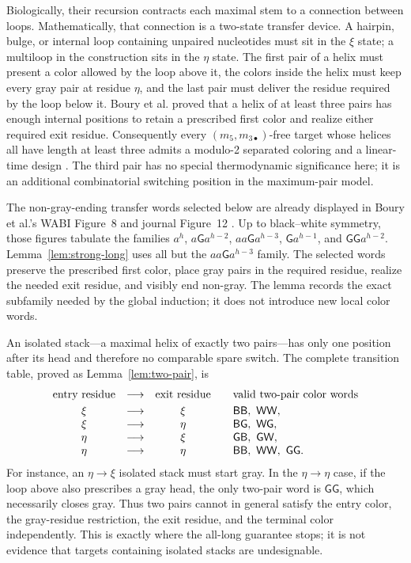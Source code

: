 \documentclass[11pt]{article}
\newcommand{\Bcol}{\mathsf{B}}
\newcommand{\Wcol}{\mathsf{W}}
\newcommand{\Gray}{\mathsf{G}}
\begin{document}
Biologically, their recursion contracts each maximal stem to a connection between loops.  Mathematically, that connection is a two-state transfer device.  A hairpin, bulge, or internal loop containing unpaired nucleotides must sit in the $\xi$ state; a multiloop in the construction sits in the $\eta$ state.  The first pair of a helix must present a color allowed by the loop above it, the colors inside the helix must keep every gray pair at residue $\eta$, and the last pair must deliver the residue required by the loop below it.  Boury et al. proved that a helix of at least three pairs has enough internal positions to retain a prescribed first color and realize either required exit residue.  Consequently every $(m_5,m_{3\bullet})$-free target whose helices all have length at least three admits a modulo-2 separated coloring and a linear-time design \citep{boury2024,boury2025}.  The third pair has no special thermodynamic significance here; it is an additional combinatorial switching position in the maximum-pair model.

The non-gray-ending transfer words selected below are already displayed in Boury et al.'s WABI Figure~8 and journal Figure~12 \citep{boury2024,boury2025}.  Up to black--white symmetry, those figures tabulate the families $a^h$, $a\Gray a^{h-2}$, $aa\Gray a^{h-3}$, $\Gray a^{h-1}$, and $\Gray\Gray a^{h-2}$.  Lemma~\ref{lem:strong-long} uses all but the $aa\Gray a^{h-3}$ family.  The selected words preserve the prescribed first color, place gray pairs in the required residue, realize the needed exit residue, and visibly end non-gray.  The lemma records the exact subfamily needed by the global induction; it does not introduce new local color words.

An isolated stack---a maximal helix of exactly two pairs---has only one position after its head and therefore no comparable spare switch.  The complete transition table, proved as Lemma~\ref{lem:two-pair}, is
\[
\begin{array}{c@{\quad\longrightarrow\quad}c@{\qquad}l}
\text{entry residue} & \text{exit residue} & \text{valid two-pair color words}\\[1mm]
\xi & \xi & \Bcol\Bcol,\ \Wcol\Wcol,\\
\xi & \eta & \Bcol\Gray,\ \Wcol\Gray,\\
\eta & \xi & \Gray\Bcol,\ \Gray\Wcol,\\
\eta & \eta & \Bcol\Bcol,\ \Wcol\Wcol,\ \Gray\Gray.
\end{array}
\]
For instance, an $\eta\to\xi$ isolated stack must start gray.  In the $\eta\to\eta$ case, if the loop above also prescribes a gray head, the only two-pair word is $\Gray\Gray$, which necessarily closes gray.  Thus two pairs cannot in general satisfy the entry color, the gray-residue restriction, the exit residue, and the terminal color independently.  This is exactly where the all-long guarantee stops; it is not evidence that targets containing isolated stacks are undesignable.
\end{document}
